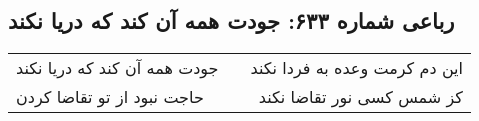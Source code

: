 \begin{center}
\section*{رباعی شماره ۶۳۳: جودت همه آن کند که دریا نکند}
\label{sec:0633}
\begin{longtable}{l p{0.5cm} r}
جودت همه آن کند که دریا نکند
&&
این دم کرمت وعده به فردا نکند
\\
حاجت نبود از تو تقاضا کردن
&&
کز شمس کسی نور تقاضا نکند
\\
\end{longtable}
\end{center}
